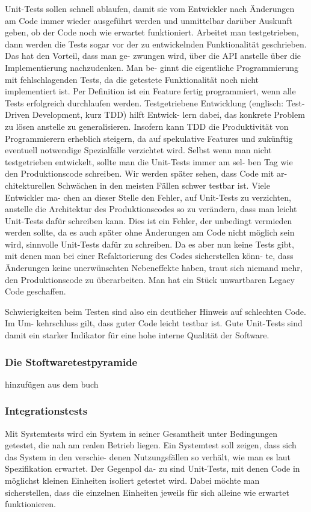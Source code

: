 Unit-Tests sollen schnell ablaufen, damit sie vom Entwickler nach Änderungen am Code
immer wieder ausgeführt werden und unmittelbar darüber Auskunft geben, ob der Code
noch wie erwartet funktioniert. Arbeitet man testgetrieben, dann werden die Tests sogar
vor der zu entwickelnden Funktionalität geschrieben. Das hat den Vorteil, dass man ge-
zwungen wird, über die API anstelle über die Implementierung nachzudenken. Man be-
ginnt die eigentliche Programmierung mit fehlschlagenden Tests, da die getestete Funktionalität 
noch nicht implementiert ist. Per Definition ist ein Feature fertig programmiert,
wenn alle Tests erfolgreich durchlaufen werden.
Testgetriebene Entwicklung (englisch: Test-Driven Development, kurz TDD) hilft Entwick-
lern dabei, das konkrete Problem zu lösen anstelle zu generalisieren. Insofern kann TDD
die Produktivität von Programmierern erheblich steigern, da auf spekulative Features und
zukünftig eventuell notwendige Spezialfälle verzichtet wird.
Selbst wenn man nicht testgetrieben entwickelt, sollte man die Unit-Tests immer am sel-
ben Tag wie den Produktionscode schreiben. Wir werden später sehen, dass Code mit ar-
chitekturellen Schwächen in den meisten Fällen schwer testbar ist. Viele Entwickler ma-
chen an dieser Stelle den Fehler, auf Unit-Tests zu verzichten, anstelle die Architektur des
Produktionscodes so zu verändern, dass man leicht Unit-Tests dafür schreiben kann. Dies
ist ein Fehler, der unbedingt vermieden werden sollte, da es auch später ohne Änderungen
am Code nicht möglich sein wird, sinnvolle Unit-Tests dafür zu schreiben. Da es aber nun
keine Tests gibt, mit denen man bei einer Refaktorierung des Codes sicherstellen könn-
te, dass Änderungen keine unerwünschten Nebeneffekte haben, traut sich niemand mehr,
den Produktionscode zu überarbeiten. Man hat ein Stück unwartbaren Legacy Code geschaffen.

Schwierigkeiten beim Testen sind also ein deutlicher Hinweis auf schlechten Code. Im Um-
kehrschluss gilt, dass guter Code leicht testbar ist. Gute Unit-Tests sind damit ein starker
Indikator für eine hohe interne Qualität der Software.

\subsubsection{Die Stoftwaretestpyramide}

hinzufügen aus dem buch



\subsubsection{Integrationstests}
Mit Systemtests wird ein System in seiner Gesamtheit unter Bedingungen getestet, die nah
am realen Betrieb liegen. Ein Systemtest soll zeigen, dass sich das System in den verschie-
denen Nutzungsfällen so verhält, wie man es laut Spezifikation erwartet. Der Gegenpol da-
zu sind Unit-Tests, mit denen Code in möglichst kleinen Einheiten isoliert getestet wird.
Dabei möchte man sicherstellen, dass die einzelnen Einheiten jeweils für sich alleine wie
erwartet funktionieren.

